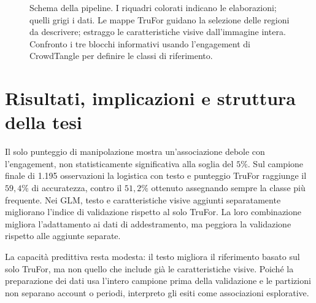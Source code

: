\begin{figure}[htbp]
    \caption{Schema della pipeline. I riquadri colorati indicano le elaborazioni; quelli grigi i dati. Le mappe TruFor guidano la selezione delle regioni da descrivere; estraggo le caratteristiche visive dall'immagine intera. Confronto i tre blocchi informativi usando l'engagement di CrowdTangle per definire le classi di riferimento.}
    \label{fig:pipeline-generale}
\end{figure}

\section{Risultati, implicazioni e struttura della tesi}
\label{sec:introduzione-organizzazione}

Il solo punteggio di manipolazione mostra un'associazione debole con l'engagement, non statisticamente significativa alla soglia del $5\%$. Sul campione finale di 1.195 osservazioni la logistica con testo e punteggio TruFor raggiunge il $59{,}4\%$ di accuratezza, contro il $51{,}2\%$ ottenuto assegnando sempre la classe più frequente. Nei GLM, testo e caratteristiche visive aggiunti separatamente migliorano l'indice di validazione rispetto al solo TruFor. La loro combinazione migliora l'adattamento ai dati di addestramento, ma peggiora la validazione rispetto alle aggiunte separate.

La capacità predittiva resta modesta: il testo migliora il riferimento basato sul solo TruFor, ma non quello che include già le caratteristiche visive. Poiché la preparazione dei dati usa l'intero campione prima della validazione e le partizioni non separano account o periodi, interpreto gli esiti come associazioni esplorative.


